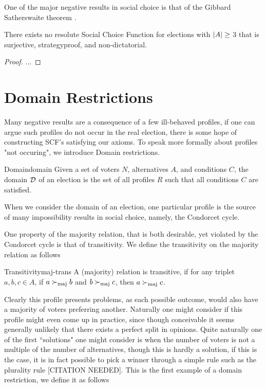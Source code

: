 One of the major negative results in social choice is that of the Gibbard Satherswaite theorem \citep{gibbardManipulationVotingSchemes1973,satterthwaiteStrategyproofnessArrowsConditions1975}.

\begin{theorem}
	There exists no resolute Social Choice Function for elections with $|A| \geq$ 3 that is surjective, strategyproof, and non-dictatorial.
\end{theorem}

\begin{proof}
	...
\end{proof}

\section{Domain Restrictions}
\label{sec: Domain-res}
Many negative results are a consequence of a few ill-behaved profiles, if one can argue such profiles do not occur in the real election, there is some hope of constructing SCF's satisfying our axioms. To speak more formally about profiles "not occuring", we introduce Domain restrictions.

\begin{definition}{Domain}{domain}
	{
		Given a set of voters $N$, alternatives $A$, and conditions $C$, the domain $\mathcal{D}_{\textnormal{}}$ of an election is the set of all profiles $R$ such that all conditions $C$ are satisfied.
	}
\end{definition}

When we consider the domain of an election, one particular profile is the source of many impossibility results in social choice, namely, the Condorcet cycle. 

One property of the majority relation, that is both desirable, yet violated by the Condorcet cycle is that of transitivity. We define the transitivity on the majority relation as follows

\begin{definition}{Transitivity}{maj-trans}
	A (majority) relation is transitive, if for any triplet $a, b, c \in A$, if $a \succ_{\textnormal{maj}} b$ and $b \succ_{\textnormal{maj}} c$, then $a \succ_{\textnormal{maj}} c$.
\end{definition}



Clearly this profile presents problems, as each possible outcome, would also have a majority of voters preferring another. Naturally one might consider if this profile might even come up in practice, since though conceivable it seems generally unlikely that there exists a perfect split in opinions. Quite naturally one of the first ``solutions" one might consider is when the number of voters is not a multiple of the number of alternatives, though this is hardly a solution, if this is the case, it is in fact possible to pick a winner through a simple rule such as the plurality rule [CITATION NEEDED]. This is the first example of a domain restriction, we define it as follows


